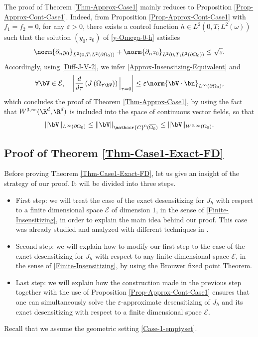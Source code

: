 The proof of Theorem \ref{Thm-Approx-Case1} mainly reduces to Proposition \ref{Prop-Approx-Cont-Case1}. Indeed, from Proposition \ref{Prop-Approx-Cont-Case1} with $f_1=f_2=0$, for any $\varepsilon >0$, there exists a control function $h \in L^2(0,T; L^2(\omega))$ such that the solution $(y_0,z_0)$ of \eqref{y-Omega-0-h} satisfies
\begin{equation}
\label{Small-Neumann-Data}
\norm{\partial_n y_0}_{L^2(0,T;L^2(\partial\Omega_0))} + \norm{\partial_n z_0}_{L^2(0,T;L^2(\partial\Omega_0))}\leq \sqrt{\varepsilon}.
\end{equation}
Accordingly, using \eqref{Diff-J-V-2}, we infer {\eqref{Approx-Insensitzing-Equivalent} and}
\[
\forall \bV \in \mathcal{E},\quad \left| \dfrac{d }{d \tau}\left({J}\left(\Omega_{\tau\bV} \right)\right)\Big|_{\tau=0}\right|
\leq \varepsilon\norm{\bV\cdot \bn}_{L^\infty(\partial \Omega_0)},
\]
which concludes the proof of Theorem \ref{Thm-Approx-Case1}, by using the fact that $W^{3,\infty}(\R^d,\R^d)$ is included into the space of continuous vector fields, so that
\[
\Vert \bV\Vert_{L^\infty(\partial\Omega_0)}\leq \Vert \bV\Vert_{\mathscr{C}^0(\overline{\Omega_0})}\leq \Vert \bV\Vert_{W^{3,\infty}(\Omega_0)}.
\]

\subsection{Proof of Theorem \ref{Thm-Case1-Exact-FD}}\label{Subsec-Proof-Exact-Case1}
Before proving Theorem \ref{Thm-Case1-Exact-FD}, let us give an insight of the strategy of our proof. It will be divided into three steps.
\begin{itemize}
\item First step: we will treat the case of the exact {desensitizing} for $J_h$ with respect to a finite dimensional space $\mathcal E$ of dimension $1$, in the sense of \eqref{Finite-Insensitizing}, in order to explain the main idea behind our proof. This case was already studied and analyzed with different techniques in \cite{Lissy-Privat-Simpore}.
\item Second step: we will explain how to modify our first step to the case of the exact {desensitizing} for $J_h$ with respect to any finite dimensional space $\mathcal E$, in the sense of \eqref{Finite-Insensitizing}, by using the Brouwer fixed point Theorem.
\item Last step: we will explain how the construction made in the previous step together with the use of Proposition \ref{Prop-Approx-Cont-Case1} ensures that {one can simultaneously solve the $\varepsilon$-approximate desensitizing of $J_h$ and its exact desensitizing with respect to a finite dimensional space $\mathcal{E}$.}
\end{itemize}
Recall that we assume the geometric setting \eqref{Case-1-emptyset}.
